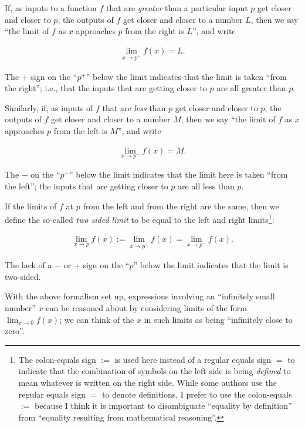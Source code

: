 If, as inputs to a function $f$ that are \textit{greater} than a particular input $p$ get closer and closer to $p$, the outputs of $f$ get closer and closer to a number $L$, then we say ``the limit of $f$ as $x$ approaches $p$ from the right is $L$'', and write

\begin{align*}
    \lim_{x \rightarrow p^+} f(x) = L.
\end{align*}

The $+$ sign on the ``$p^+$'' below the limit indicates that the limit is taken ``from the right''; i.e., that the inputs that are getting closer to $p$ are all greater than $p$.

Similarly, if, as inputs of $f$ that are \textit{less} than $p$ get closer and closer to $p$, the outputs of $f$ get closer and closer to a number $M$, then we say ``the limit of $f$ as $x$ approaches $p$ from the left is $M$'', and write

\begin{align*}
    \lim_{x \rightarrow p^-} f(x) = M.
\end{align*}

The $-$ on the ``$p^-$'' below the limit indicates that the limit here is taken ``from the left''; the inputs that are getting closer to $p$ are all less than $p$.

If the limits of $f$ at $p$ from the left and from the right are the same, then we define the so-called \textit{two sided limit} to be equal to the left and right limits\footnote{The colon-equals sign $:=$ is used here instead of a regular equals sign $=$ to indicate that the combination of symbols on the left side is being \textit{defined} to mean whatever is written on the right side. While some authors use the regular equals sign $=$ to denote definitions, I prefer to use the colon-equals $:=$ because I think it is important to disambiguate ``equality by definition'' from ``equality resulting from mathematical reasoning''.}:

\begin{align*}
    \lim_{x \rightarrow p} f(x) 
    := \lim_{x \rightarrow p^+} f(x) 
    = \lim_{x \rightarrow p^-} f(x).
\end{align*}

The lack of a $-$ or $+ $ sign on the ``$p$'' below the limit indicates that the limit is two-sided.

With the above formalism set up, expressions involving an ``infinitely small number'' $x$ can be reasoned about by considering limits of the form $\lim_{x \rightarrow 0} f(x)$; we can think of the $x$ in such limits as being ``infinitely close to zero''.

